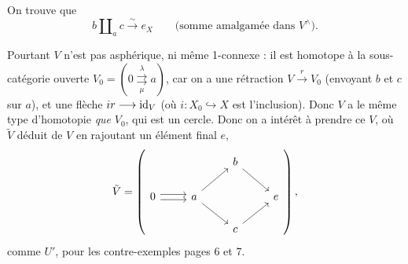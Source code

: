On trouve que
\[ b \amalg_a c \xrightarrow{\ \sim\ } e_X \qquad \text{(somme amalgamée dans } V^{\wedge}\text{).} \] %

Pourtant $V$ n'est pas asphérique, ni même 1-connexe : il est homotope à la sous-catégorie ouverte $V_0 = (0 \overset{\lambda}{\underset{\mu}{\rightrightarrows}} a)$, car on a une rétraction $V \xrightarrow{\ r\ } V_0$ (envoyant $b$ et $c$ sur $a$), et une flèche $ir \longrightarrow \mathrm{id}_V$ (où $i : X_0 \hookrightarrow X$ est l'inclusion). Donc $V$ a le même type d'homotopie \textit{que} $V_0$, qui est un cercle. Donc on a intérêt à prendre ce $V$, où $\tilde{V}$ déduit de $V$ en rajoutant un élément final $e$, %
\[
\tilde{V} = \left(
\begin{tikzcd}
& & b \arrow[dr] & \\
0 \arrow[r, shift left] \arrow[r, shift right] & a \arrow[ur] \arrow[dr] & & e \\
& & c \arrow[ur] &
\end{tikzcd}
\right),
\]
comme $U'$, pour les contre-exemples pages 6 et 7.

